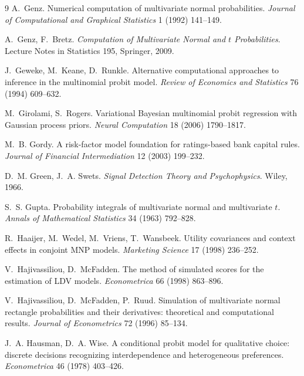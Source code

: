\documentclass[12pt]{article}
\theoremstyle{remark}
\begin{document}
\begin{thebibliography}{9}
 A.~Genz. Numerical computation of multivariate normal
probabilities. \emph{Journal of Computational and Graphical
Statistics} 1 (1992)
141--149.

 A.~Genz, F.~Bretz.
\emph{Computation of Multivariate Normal and $t$ Probabilities}. Lecture
Notes in Statistics 195, Springer, 2009.

 J.~Geweke, M.~Keane, D.~Runkle. Alternative computational
approaches to inference in the multinomial probit model. \emph{Review of
Economics and Statistics} 76 (1994) 609--632.

 M.~Girolami,
S.~Rogers. Variational Bayesian multinomial probit regression with
Gaussian process priors. \emph{Neural Computation} 18 (2006) 1790--1817.

 M.~B. Gordy. A risk-factor model
foundation for ratings-based bank capital rules. \emph{Journal of
Financial Intermediation} 12 (2003) 199--232.

 D.~M. Green, J.~A. Swets.
\emph{Signal Detection Theory and Psychophysics}. Wiley, 1966.

 S.~S. Gupta. Probability integrals of
multivariate normal and multivariate $t$. \emph{Annals of Mathematical
Statistics} 34 (1963) 792--828.

 R.~Haaijer, M.~Wedel, M.~Vriens, T.~Wansbeek.
Utility covariances and context effects in conjoint MNP models.
\emph{Marketing Science} 17 (1998) 236--252.

 V.~Hajivassiliou, D.~McFadden. The method of
simulated scores for the estimation of LDV models. \emph{Econometrica} 66
(1998) 863--896.

 V.~Hajivassiliou, D.~McFadden, P.~Ruud. Simulation of
multivariate normal rectangle probabilities and their derivatives:
theoretical and computational results. \emph{Journal of Econometrics} 72
(1996) 85--134.

 J.~A. Hausman, D.~A.
Wise. A conditional probit model for qualitative choice: discrete
decisions recognizing interdependence and heterogeneous preferences.
\emph{Econometrica} 46 (1978) 403--426.


\end{thebibliography}
\end{document}
